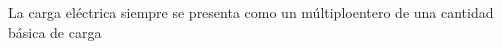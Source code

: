 \documentclass[preview]{standalone}
\begin{document}
La carga eléctrica siempre se presenta como
 un múltiploentero de una cantidad básica de carga\\
\end{document}
